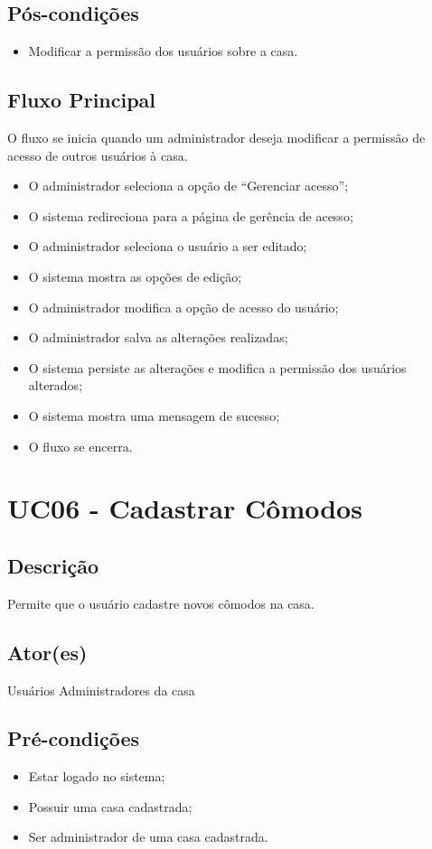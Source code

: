     \subsection{Pós-condições}
        \begin{itemize}
            \item Modificar a permissão dos usuários sobre a casa.
        \end{itemize}
    \subsection{Fluxo Principal}
        O fluxo se inicia quando um administrador deseja modificar a permissão de acesso de outros usuários à casa.
        \begin{itemize}
            \item O administrador seleciona a opção de “Gerenciar acesso”;
            \item O sistema redireciona para a página de gerência de acesso;
            \item O administrador seleciona o usuário a ser editado;
            \item O sistema mostra as opções de edição;
            \item O administrador modifica a opção de acesso do usuário;
            \item O administrador salva as alterações realizadas;
            \item O sistema persiste as alterações e modifica a permissão dos usuários alterados;
            \item O sistema mostra uma mensagem de sucesso;
            \item O fluxo se encerra.
        \end{itemize}

\section{UC06 \-- Cadastrar Cômodos}
    \subsection{Descrição}
        Permite que o usuário cadastre novos cômodos na casa.
    \subsection{Ator(es)}
        Usuários Administradores da casa
    \subsection{Pré-condições}
        \begin{itemize}
            \item Estar logado no sistema;
            \item Possuir uma casa cadastrada;
            \item Ser administrador de uma casa cadastrada.
        \end{itemize}
